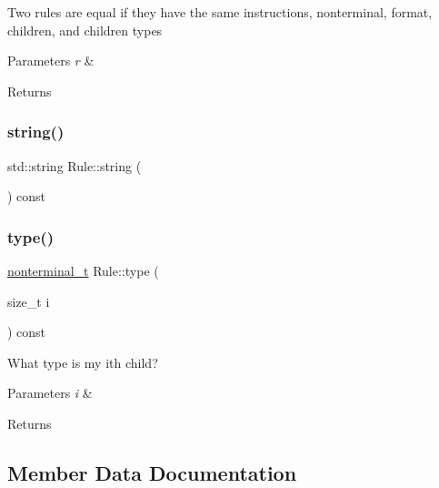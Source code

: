 Two rules are equal if they have the same instructions, nonterminal, format, children, and children types 
\begin{DoxyParams}{Parameters}
{\em r} & \\
\hline
\end{DoxyParams}
\begin{DoxyReturn}{Returns}

\end{DoxyReturn}
\mbox{\label{class_rule_a7f16256eabd7bd8b94fbcf857bf1e45b}} 
\subsubsection{\texorpdfstring{string()}{string()}}
{\footnotesize\ttfamily std\+::string Rule\+::string (\begin{DoxyParamCaption}{ }\end{DoxyParamCaption}) const\hspace{0.3cm}{\ttfamily [inline]}}

\mbox{\label{class_rule_a97db8e22bb8445b92779eb165bb29ae5}} 
\subsubsection{\texorpdfstring{type()}{type()}}
{\footnotesize\ttfamily \hyperlink{_nonterminal_8h_a1c5bfe9b903f69c83bbde5da7035fef3}{nonterminal\+\_\+t} Rule\+::type (\begin{DoxyParamCaption}\item[{size\+\_\+t}]{i }\end{DoxyParamCaption}) const\hspace{0.3cm}{\ttfamily [inline]}}

What type is my i\textquotesingle{}th child? 
\begin{DoxyParams}{Parameters}
{\em i} & \\
\hline
\end{DoxyParams}
\begin{DoxyReturn}{Returns}

\end{DoxyReturn}


\subsection{Member Data Documentation}
\mbox{\label{class_rule_afdd38b9432cea46b5cea54b1bb841c07}} 
